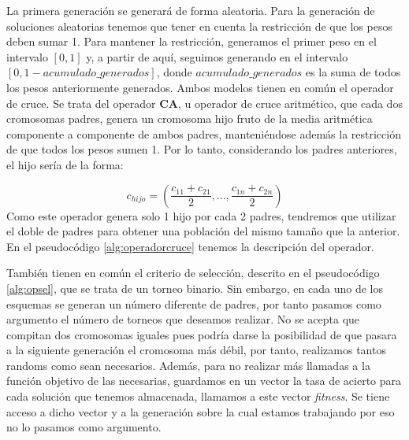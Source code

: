 La primera generación se generará de forma aleatoria. Para la generación de soluciones aleatorias tenemos que tener en cuenta la restricción de que los pesos deben sumar 1. Para mantener la restricción, generamos el primer peso en el intervalo $[0,1]$ y, a partir de aquí, seguimos generando en el intervalo $[0,1-acumulado\_generados]$, donde $acumulado\_generados$ es la suma de todos los pesos anteriormente generados.
\newpage
Ambos modelos tienen en común el operador de cruce. Se trata del operador \textbf{CA}, u operador de cruce aritmético, que cada dos cromosomas padres, genera un cromosoma hijo fruto de la media aritmética componente a componente de ambos padres, manteniéndose además la restricción de que todos los pesos sumen 1. Por lo tanto, considerando los padres anteriores, el hijo sería de la forma:

$$
c_{hijo} = ( \frac{c_{11} + c_{21}}{2}, ..., \frac{c_{1n} + c_{2n}}{2})
$$
Como este operador genera solo 1 hijo por cada 2 padres, tendremos que utilizar el doble de padres para obtener una población del mismo tamaño que la anterior. En el pseudocódigo \ref{alg:operadorcruce} tenemos la descripción del operador.

También tienen en común el criterio de selección, descrito en el pseudocódigo \ref{alg:opsel}, que se trata de un torneo binario.   Sin embargo, en cada uno de los esquemas se generan un número diferente de padres, por tanto pasamos como argumento el número de torneos que deseamos realizar. No se acepta que compitan dos cromosomas iguales pues podría darse la posibilidad de que pasara a la siguiente generación el cromosoma más débil, por tanto, realizamos tantos randoms como sean necesarios. Además, para no realizar más llamadas a la función objetivo de las necesarias, guardamos en un vector la tasa de acierto para cada solución que tenemos almacenada, llamamos a este vector \textit{fitness}. Se tiene acceso a dicho vector y a la generación sobre la cual estamos trabajando por eso no lo pasamos como argumento.

